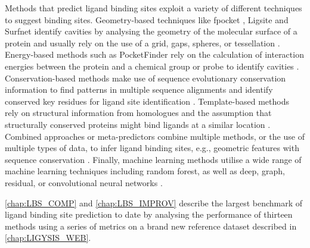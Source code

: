 Methods that predict ligand binding sites exploit a variety of different techniques to suggest binding sites. Geometry-based techniques like fpocket \cite{GUILLOUX_2009_FPOCKET}, Ligsite \cite{HENDLICH_1997_LIGSITE} and Surfnet \cite{LASKOWSKI_1995_SURFNET} identify cavities by analysing the geometry of the molecular surface of a protein and usually rely on the use of a grid, gaps, spheres, or tessellation \cite{GUILLOUX_2009_FPOCKET, LIANG_1998_CAVITIES, HENDLICH_1997_LIGSITE, LASKOWSKI_1995_SURFNET, KLEYWEGT_1994_CAVITIES, LEVITT_1992_POCKET, BRADY_2000_PASS, WEISEL_2007_POCKETPICKER}. Energy-based methods such as PocketFinder \cite{AN_2005_POCKETFINDER} rely on the calculation of interaction energies between the protein and a chemical group or probe to identify cavities \cite{AN_2005_POCKETFINDER, GOODFORD_1982_PREDICTOR, AN_2004_PREDICTOR, LAURIE_2005_QSITEFINDER, GHERSI_2009_SITEHOUND, NGAN_2012_FTSITE}. Conservation-based methods make use of sequence evolutionary conservation information to find patterns in multiple sequence alignments and identify conserved key residues for ligand site identification \cite{ARMON_2001_SCORE, PUPKO_2002_RATE4SITE, XIE_2012_CONSPRED}. Template-based methods rely on structural information from homologues and the assumption that structurally conserved proteins might bind ligands at a similar location \cite{ZVELEBIL_1987_PREDICTION, WASS_2010_3DLIGANDSITE, ROY_2012_COFACTOR, YANG_2013_COFACTOR, LEE_2013_PREDICTION, BRYLINSKI_2013_EFINDSITE}. Combined approaches or meta-predictors combine multiple methods, or the use of multiple types of data, to infer ligand binding sites, e.g., geometric features with sequence conservation \cite{GUTTERIDGE_2003_LBSP, HUANG_2006_BU48, GLASER_2006_PREDICTION, HALGREN_2009_PREDICITON, CAPRA_2009_CONCAVITY, HUANG_2009_METAPOCKET, BRAY_2009_SITESIDENTIFY, BRYLINSKI_2009_FINDSITE}. Finally, machine learning methods utilise a wide range of machine learning techniques including random forest, as well as deep, graph, residual, or convolutional neural networks \cite{KRIVAK_2015_PRANK, KRIVAK_2015_P2RANK, JIMENEZ_2017_DEEPSITE, KRIVAK_2018_P2RANK, SANTANA_2020_GRaSP, KOZLOVSKII_2020_BITENET, STEPNIEWSKA_2020_KALASANTY, KANDEL_2021_PURESNET, MYOLNAS_2021_DEEPSURF, YAN_2022_POINTSITE, LI_2022_RECURPOCKET, AGGARWAL_2022_DEEPPOCKET, ABDOLLAHI_2023_NODECODER, EVTEEV_2023_SITERADAR, LI_2023_GLPOCKET, ZHANG_2024_EQUIPOCKET, LIU_2023_REFINEPOCKET, SMITH_2024_GrASP, CARBERY_2024_IFSP, SESTAK_2024_VNEGNN, KANDEL_2024_PURESNET}.

\autoref{chap:LBS_COMP} and \autoref{chap:LBS_IMPROV} describe the largest benchmark of ligand binding site prediction to date by analysing the performance of thirteen methods using a series of metrics on a brand new reference dataset described in \autoref{chap:LIGYSIS_WEB}.

